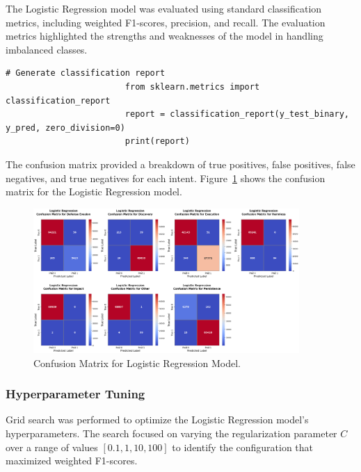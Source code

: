             The Logistic Regression model was evaluated using standard classification metrics, including weighted F1-scores, precision, and recall. The evaluation metrics highlighted the strengths and weaknesses of the model in handling imbalanced classes. 

                \begin{lstlisting}[caption={Generate classification report}, label={lst:logistic_regression_eval}]
                        # Generate classification report
                        from sklearn.metrics import classification_report
                        report = classification_report(y_test_binary, y_pred, zero_division=0)
                        print(report)
                \end{lstlisting}

            The confusion matrix provided a breakdown of true positives, false positives, false negatives, and true negatives for each intent. Figure~\ref{fig:logistic_cm} shows the confusion matrix for the Logistic Regression model.

            \begin{figure}[H]
                \centering
                \includegraphics[width=0.9\textwidth]{../figures/plots/section2/Logistic_Regression_normalized_confusion_matrix_test.png}
                \caption{Confusion Matrix for Logistic Regression Model.}
                \label{fig:logistic_cm}
            \end{figure}

        \subsubsection{Hyperparameter Tuning \\}

            Grid search was performed to optimize the Logistic Regression model's hyperparameters. The search focused on varying the regularization parameter \( C \) over a range of values \([0.1, 1, 10, 100]\) to identify the configuration that maximized weighted F1-scores.

